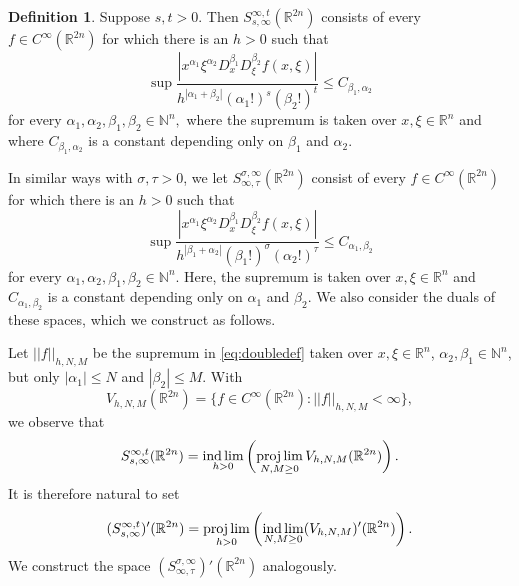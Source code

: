 \documentclass[11pt,a4paper,reqno]{amsart}
\numberwithin{equation}{section}
\theoremstyle{definition}
\theoremstyle{definition}
\newtheorem{definition}[thm]{Definition}
\DeclareMathOperator*{\indlim}{ind\,lim}
\begin{document}
    \begin{definition}
     Suppose $s,t> 0$. Then $S_{s,\infty}^{\infty,t}(\mathbb{R}^{2 n})$ consists of every $f\in C^\infty(\mathbb{R}^{2 n})$ for which there is an $h>0$ such that
     \begin{equation}\label{eq:doubledef}
         \sup \dfrac{\left| x^{\alpha_1} \xi^{\alpha_2} D_x^{\beta_1} D_\xi^{\beta_2} f(x,\xi) \right|}{h^{|\alpha_1 + \beta_2|}(\alpha_1!)^s (\beta_2!)^t} \leq C_{\beta_1,\alpha_2}
     \end{equation}
     for every $\alpha_1,\alpha_2,\beta_1,\beta_2\in \mathbb{N}^n,$ where the supremum is taken over $x,\xi\in\mathbb{R}^n$ and where $C_{\beta_1,\alpha_2}$ is a constant depending only on $\beta_1$ and $\alpha_2$.
    \end{definition}
    In similar ways with $\sigma,\tau>0$, we let $S_{\infty,\tau}^{\sigma,\infty}(\mathbb{R}^{2 n})$ consist of every $f\in C^\infty(\mathbb{R}^{2 n})$ for which there is an $h>0$ such that
     \begin{equation}\label{eq:doubledef2}
         \sup \dfrac{\left| x^{\alpha_1} \xi^{\alpha_2} D_x^{\beta_1} D_\xi^{\beta_2} f(x,\xi) \right|}{h^{|\beta_1+\alpha_2|}(\beta_1!)^{\sigma}(\alpha_2!)^{\tau}} \leq C_{\alpha_1,\beta_2}
     \end{equation}
     for every $\alpha_1,\alpha_2,\beta_1,\beta_2\in \mathbb{N}^n$. Here, the supremum is taken over $x,\xi\in\mathbb{R}^n$ and $C_{\alpha_1,\beta_2}$ is a constant depending only on $\alpha_1$ and $\beta_2$.
    We also consider the duals of these spaces, which we construct as follows.

    Let $||f||_{h,N,M}$ be the supremum in \eqref{eq:doubledef} taken over $x,\xi\in\mathbb{R}^n$, $\alpha_2,\beta_1\in\mathbb{N}^n$, but only $|\alpha_1|\leq N$ and $|\beta_2|\leq M$. With \[ V_{h,N,M}(\mathbb{R}^{2 n}) = \{f\in C^\infty(\mathbb{R}^{2 n}): ||f||_{h,N,M}<\infty \},\] we observe that
    \begin{equation}
        S_{s,\infty}^{\infty,t}(\mathbb{R}^{2 n}) = \indlim_{h>0} \left(\projlim_{N,M\geq 0} V_{h,N,M}(\mathbb{R}^{2 n}) \right).
    \end{equation}
    It is therefore natural to set
    \begin{equation}
        (S_{s,\infty}^{\infty,t})'(\mathbb{R}^{2 n}) = \projlim_{h>0} \left(\indlim_{N,M\geq 0} (V_{h,N,M})'(\mathbb{R}^{2 n}) \right).
    \end{equation}
    We construct the space $(S_{\infty,\tau}^{\sigma,\infty})'(\mathbb{R}^{2 n})$ analogously.
    
\end{document}
